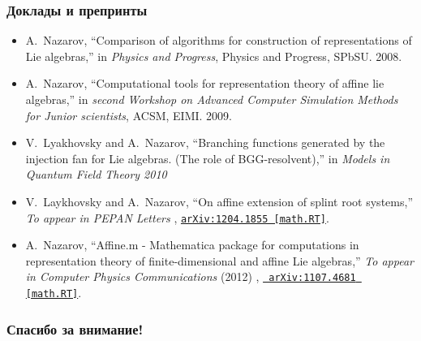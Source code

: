 \documentclass[pdftex]{beamer}
\theoremstyle{definition} \newtheorem{Def}{Определение}
\begin{document}
\begin{frame}
  \frametitle{Доклады и препринты}
  \begin{itemize}
  \item
    A.~Nazarov, ``Comparison of algorithms for construction of representations of
    Lie algebras,'' in {\em Physics and Progress}, Physics and Progress, SPbSU.
     2008.

  \item
    A.~Nazarov, ``Computational tools for representation theory of affine lie
    algebras,'' in {\em second Workshop on Advanced Computer Simulation Methods
      for Junior scientists}, ACSM, EIMI.
     2009.

  \item
    V.~{Lyakhovsky} and A.~{Nazarov}, ``{Branching functions generated by the
      injection fan for Lie algebras. (The role of BGG-resolvent)},'' in 
    {\em Models in Quantum Field Theory 2010} 

  \item
    V.~{Laykhovsky} and A.~{Nazarov}, ``{On affine extension of splint root
      systems},'' {\em To appear in PEPAN Letters}  ,
    \href{http://arxiv.org/abs/1204.1855}{{\tt arXiv:1204.1855 [math.RT]}}.
  \item
    A.~{Nazarov}, ``{Affine.m - Mathematica package for computations in
      representation theory of finite-dimensional and affine Lie algebras},'' {\em
    To appear in Computer Physics Communications} (2012)  , \href{http://arxiv.org/abs/1107.4681}{{\tt
        arXiv:1107.4681 [math.RT]}}.
  \end{itemize}
\end{frame}

\begin{frame}
  \frametitle{Спасибо за внимание!}
\end{frame}
\end{document}
